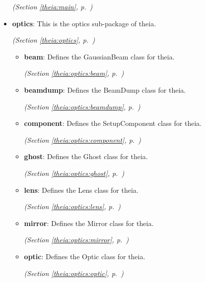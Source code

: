 \begin{itemize}
  \textit{(Section \ref{theia:main}, p.~\pageref{theia:main})}

\item \textbf{optics}: This is the optics sub-package of theia.



  \textit{(Section \ref{theia:optics}, p.~\pageref{theia:optics})}

  \begin{itemize}
\setlength{\parskip}{0ex}
    \item \textbf{beam}: Defines the GaussianBeam class for theia.



  \textit{(Section \ref{theia:optics:beam}, p.~\pageref{theia:optics:beam})}

    \item \textbf{beamdump}: Defines the BeamDump class for theia.



  \textit{(Section \ref{theia:optics:beamdump}, p.~\pageref{theia:optics:beamdump})}

    \item \textbf{component}: Defines the SetupComponent class for theia.



  \textit{(Section \ref{theia:optics:component}, p.~\pageref{theia:optics:component})}

    \item \textbf{ghost}: Defines the Ghost class for theia.



  \textit{(Section \ref{theia:optics:ghost}, p.~\pageref{theia:optics:ghost})}

    \item \textbf{lens}: Defines the Lens class for theia.



  \textit{(Section \ref{theia:optics:lens}, p.~\pageref{theia:optics:lens})}

    \item \textbf{mirror}: Defines the Mirror class for theia.



  \textit{(Section \ref{theia:optics:mirror}, p.~\pageref{theia:optics:mirror})}

    \item \textbf{optic}: Defines the Optic class for theia.



  \textit{(Section \ref{theia:optics:optic}, p.~\pageref{theia:optics:optic})}


\end{itemize}
\end{itemize}
